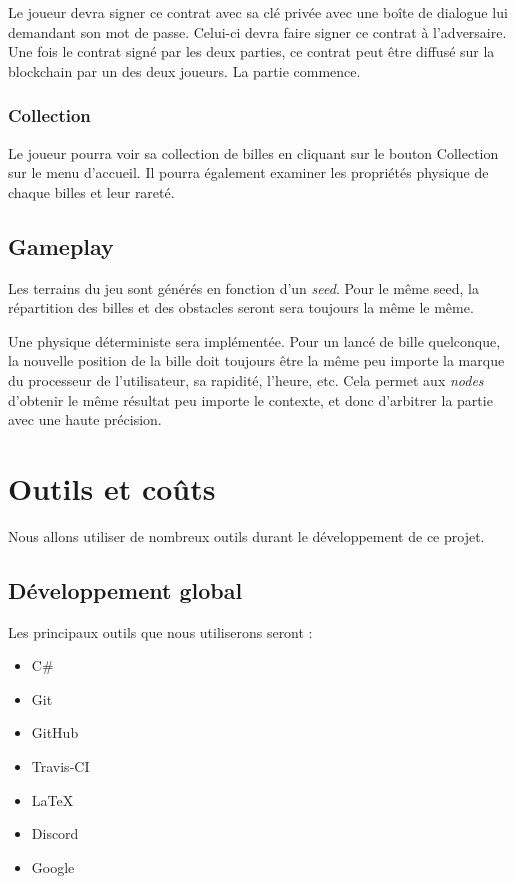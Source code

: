 \documentclass{article}
\begin{document}
Le joueur devra signer ce contrat avec sa clé privée avec une boîte de dialogue lui demandant son mot de passe. Celui-ci devra faire signer ce contrat à l'adversaire. Une fois le contrat signé par les deux parties, ce contrat peut être diffusé sur la blockchain par un des deux joueurs. La partie commence.

\subsubsection{Collection}
Le joueur pourra voir sa collection de billes en cliquant sur le bouton Collection sur le menu d'accueil. Il pourra également examiner les propriétés physique de chaque billes et leur rareté.

\subsection{Gameplay}
Les terrains du jeu sont générés en fonction d'un \textit{seed}. Pour le même seed, la répartition des billes et des obstacles seront sera toujours la même le même.

Une physique déterministe sera implémentée. Pour un lancé de bille quelconque, la nouvelle position de la bille doit toujours être la même peu importe la marque du processeur de l'utilisateur, sa rapidité, l'heure, etc. Cela permet aux \textit{nodes} d'obtenir le même résultat peu importe le contexte, et donc d'arbitrer la partie avec une haute précision.


\section{Outils et coûts}
Nous allons utiliser de nombreux outils durant le développement de ce projet.

\subsection{Développement global}
Les principaux outils que nous utiliserons seront :

\begin{itemize}
    \item C\#
    \item Git
    \item GitHub
    \item Travis-CI
    \item \LaTeX
    \item Discord
    \item Google

\end{itemize}
\end{document}
